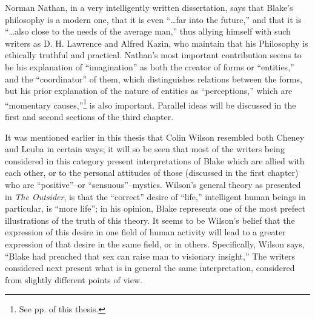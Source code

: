 Norman Nathan, in a very intelligently written dissertation,\supercite{prince:conception-of-blake}
says that Blake's philosophy is a modern one, that it is even \enquote{\dots far into the future,} and that it is
\enquote{\dots also close to the needs of the average man,}\supercite{prince:conception-of-blake}
thus allying himself with such writers as D. H. Lawrence and Alfred Kazin, who maintain that his Philosophy is ethically
truthful and practical. Nathan's most important contribution seems to be his explanation of
\enquote{imagination} as both the creator of forms or \enquote{entities,} and the \enquote{coordinator} of them,
which distinguishes relations between the forms,\supercite{prince:conception-of-blake}
but his prior explanation of the nature of entities as \enquote{perceptions,} which are \enquote{momentary causes,}\supercite{keynes:william-blake}\footnote{See pp. \pageref{self:16} of this thesis.}
is also important. Parallel ideas will be discussed in the first and second sections of the third chapter.

It was mentioned earlier in this thesis that Colin
Wilson resembled both Cheney and Leuba in certain ways; it
will so be seen that most of the writers being considered
in this category present interpretations of Blake which are
allied with each other, or to the personal attitudes of
those (discussed in the first chapter) who are \enquote{positive}--or
\enquote{sensuous}--mystics. Wilson's general theory as presented in \emph{The Outsider},\supercite{wilson:the-outsider}
is that the \enquote{correct} desire of \enquote{life,} intelligent human beings in particular, is \enquote{more life};
in his opinion, Blake represents one of the most
prefect illustrations of the truth of this theory. It seems to be Wilson's
belief that the expression of this desire in one field of human activity will lead to a greater expression of that desire in the same field, or
in others. Specifically, Wilson says, \enquote{Blake had preached that sex can raise man to visionary insight,}\supercite{wilson:the-outsider}
The writers considered next present what is in general the same interpretation, considered
from slightly different points of view.

